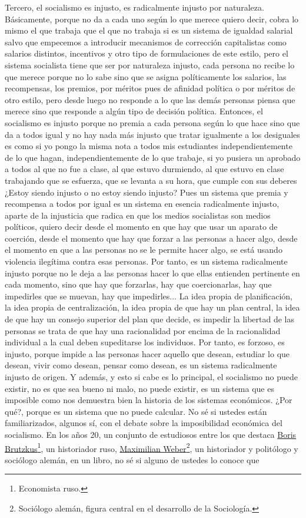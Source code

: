 Tercero, el socialismo es injusto, es radicalmente injusto por naturaleza. Básicamente, porque no da a cada uno según lo que merece quiero decir, cobra lo mismo el que trabaja que el que no trabaja si es un sistema de igualdad salarial salvo que empecemos a introducir mecanismos de corrección capitalistas como salarios distintos, incentivos y otro tipo de formulaciones de este estilo, pero el sistema socialista tiene que ser por naturaleza injusto, cada persona no recibe lo que merece porque no lo sabe sino que se asigna políticamente los salarios, las recompensas, los premios, por méritos pues de afinidad política o por méritos de otro estilo, pero desde luego no responde a lo que las demás personas piensa que merece sino que responde a algún tipo de decisión política. Entonces, el socialismo es injusto porque no premia a cada persona según lo que hace sino que da a todos igual y no hay nada más injusto que tratar igualmente a los desiguales es como si yo pongo la misma nota a todos mis estudiantes independientemente de lo que hagan, independientemente de lo que trabaje, si yo pusiera un aprobado a todos al que no fue a clase, al que estuvo durmiendo, al que estuvo en clase trabajando que se esfuerza, que se levanta a su hora, que cumple con sus deberes ¿Estoy siendo injusto o no estoy siendo injusto? Pues un sistema que premia y recompensa a todos por igual es un sistema en esencia radicalmente injusto, aparte de la injusticia que radica en que los medios socialistas son medios políticos, quiero decir desde el momento en que hay que usar un aparato de coerción, desde el momento que hay que forzar a las personas a hacer algo, desde el momento en que a las personas no se le permite hacer algo, se está usando violencia ilegítima contra esas personas. Por tanto, es un sistema radicalmente injusto porque no le deja a las personas hacer lo que ellas entienden pertinente en cada momento, sino que hay que forzarlas, hay que coercionarlas, hay que impedirles que se muevan, hay que impedirles... La idea propia de planificación, la idea propia de centralización, la idea propia de que hay un plan central, la idea de que hay un consejo superior del plan que decide, es impedir la libertad de las personas se trata de que hay una racionalidad por encima de la racionalidad individual a la cual deben supeditarse los individuos. Por tanto, es forzoso, es injusto, porque impide a las personas hacer aquello que desean, estudiar lo que desean, vivir como desean, pensar como desean, es un sistema radicalmente injusto de origen. Y además, y esto si cabe es lo principal, el socialismo no puede existir, no es que sea bueno ni malo, no puede existir, es un sistema que es imposible como nos demuestra bien la historia de los sistemas económicos. ¿Por qué?, porque es un sistema que no puede calcular. No sé si ustedes están familiarizados, algunos sí, con el debate sobre la imposibilidad económica del socialismo. En los años 20, un conjunto de estudiosos entre los que destaca \href{Boris Brutzkus}{Boris Brutzkus}\footnote{Economista ruso.}, un historiador ruso, \href{https://en.wikipedia.org/wiki/Max_Weber}{Maximilian Weber}\footnote{Sociólogo alemán, figura central en el desarrollo de la Sociología.}, un historiador y politólogo y sociólogo alemán, en un libro, no sé si alguno de ustedes lo conoce que 